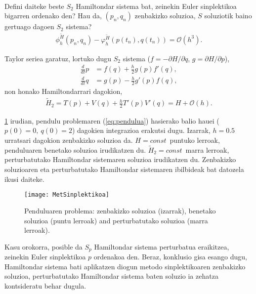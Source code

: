 \paragraph*{}Defini daiteke beste $S_2$ Hamiltondar sistema bat, zeinekin Euler sinplektikoa bigarren ordenako den? Hau da, $(p_n,q_n)$ zenbakizko soluzioa, $S$ soluziotik baino gertuago dagoen $S_2$ sistema? 
\begin{align*}
\phi_h^{\widetilde{H}}(p_n,q_n)-\varphi_h^{\widetilde{H}}(p(t_n),q(t_n))= \mathcal{O}(h^3).
\end{align*}

Taylor seriea garatuz, lortuko dugu $S_2$ sistema  ($f=-\partial H/\partial q$, $g=\partial H/\partial p$),
\begin{align*}
\frac{d}{dt} p &= f(q)+ \frac{h}{2} g(p) f'(q),\\
\frac{d}{dt} q &= g(p)- \frac{h}{2} g'(p) f(q),
\end{align*} 
non honako Hamiltondarrari dagokion,
\begin{align*}
\widetilde{H}_2=T(p)+V(q)+\frac{h}{2} T'(p) V'(q) = H+\mathcal{O}(h).
\end{align*}

\ref{fig:MetSinplektikoa} irudian, pendulu problemaren (\ref{eq:pendulua}) hasierako balio hauei ($p(0)=0, \ q(0)=2$) dagokien integrazioa erakutsi dugu. Izarrak, $h=0.5$ urratsari dagokion zenbakizko soluzioa da. $H=const$~puntuko lerroak, penduluaren benetako soluzioa irudikatzen du.  $\widetilde{H}_2=const$~marra lerroak, perturbatutako Hamiltondar sistemaren soluzioa irudikatzen du. Zenbakizko soluzioaren eta perturbatutako Hamiltondar sistemaren ibilbideak bat datozela ikusi daiteke. 

\begin{figure}[h!]
\centering
\texttt{[image: MetSinplektikoa]}
\caption{ \small Penduluaren problema: zenbakizko soluzioa (izarrak), benetako soluzioa (puntu lerroak) and perturbatutako soluzioa (marra lerroak).}
\label{fig:MetSinplektikoa}
\end{figure}

Kasu orokorra, posible da $S_p$ Hamiltondar sistema perturbatua eraikitzea, zeinekin Euler sinplektikoa $p$ ordenakoa den. Beraz, konklusio gisa esango dugu, Hamiltondar sistema bati aplikatzen diogun metodo sinplektikoaren zenbakizko soluzioa, perturbatutako Hamiltondar sistema baten soluzio ia zehatza kontsideratu behar dugula. 

